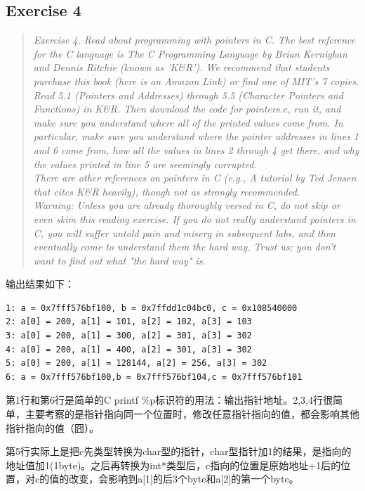 \subsection{Exercise 4}
\begin{quote} \textit{Exercise 4. Read about programming with pointers in C. The best reference for the C language is The C Programming Language by Brian Kernighan and Dennis Ritchie (known as 'K\&R'). We recommend that students purchase this book (here is an Amazon Link) or find one of MIT's 7 copies.\\
Read 5.1 (Pointers and Addresses) through 5.5 (Character Pointers and Functions) in K\&R. Then download the code for pointers.c, run it, and make sure you understand where all of the printed values come from. In particular, make sure you understand where the pointer addresses in lines 1 and 6 come from, how all the values in lines 2 through 4 get there, and why the values printed in line 5 are seemingly corrupted.\\
There are other references on pointers in C (e.g., A tutorial by Ted Jensen that cites K\&R heavily), though not as strongly recommended.\\
Warning: Unless you are already thoroughly versed in C, do not skip or even skim this reading exercise. If you do not really understand pointers in C, you will suffer untold pain and misery in subsequent labs, and then eventually come to understand them the hard way. Trust us; you don't want to find out what "the hard way" is.} \end{quote}

输出结果如下：\\
\begin{lstlisting}
1: a = 0x7fff576bf100, b = 0x7ffdd1c04bc0, c = 0x108540000
2: a[0] = 200, a[1] = 101, a[2] = 102, a[3] = 103
3: a[0] = 200, a[1] = 300, a[2] = 301, a[3] = 302
4: a[0] = 200, a[1] = 400, a[2] = 301, a[3] = 302
5: a[0] = 200, a[1] = 128144, a[2] = 256, a[3] = 302
6: a = 0x7fff576bf100,b = 0x7fff576bf104,c = 0x7fff576bf101
\end{lstlisting}

第1行和第6行是简单的C printf \%p标识符的用法：输出指针地址。2,3,4行很简单，主要考察的是指针指向同一个位置时，修改任意指针指向的值，都会影响其他指针指向的值（囧）。

第5行实际上是把c先类型转换为char型的指针，char型指针加1的结果，是指向的地址值加1(1byte)。之后再转换为int*类型后，c指向的位置是原始地址+1后的位置，对c的值的改变，会影响到a[1]的后3个byte和a[2]的第一个byte。

